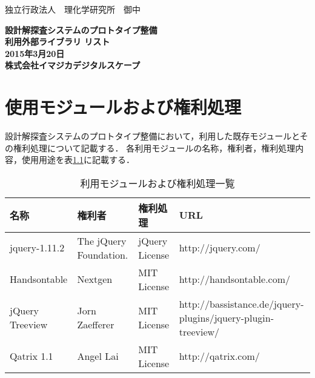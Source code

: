\documentclass[a4paper,10pt,oneside]{jsbook}
\begin{document}
\begin{titlepage}
\noindent
独立行政法人　理化学研究所　御中
\begin{center}
	\vspace{8cm}
	{\Huge \textbf{設計解探査システムのプロトタイプ整備} } \\
	\vspace{1cm}
	{\Huge \textbf{利用外部ライブラリ リスト}} \\
	\vspace{10cm}
	{\Large \textbf{2015年3月20日}} \\
	\vspace{0.5cm}
	{\Large \textbf{株式会社イマジカデジタルスケープ}}
\end{center}
\end{titlepage}

\tableofcontents

\chapter{使用モジュールおよび権利処理}
設計解探査システムのプロトタイプ整備において，利用した既存モジュールとその権利処理について記載する．
各利用モジュールの名称，権利者，権利処理内容，使用用途を表\ref{ops}に記載する．

\begin{table}[htbp]
\begin{center}
\caption{利用モジュールおよび権利処理一覧}
\label{ops}
\begin{tabular}{|l|l|l|l|}
\hline
名称 & 権利者 & 権利処理  & URL \\
\hline
\hline
jquery-1.11.2 & The jQuery Foundation. &  jQuery License & http://jquery.com/  \\
\hline
Handsontable & Nextgen & MIT License &  http://handsontable.com/ \\
\hline
jQuery Treeview & Jorn Zaefferer & MIT License & http://bassistance.de/jquery-plugins/jquery-plugin-treeview/\\
\hline
Qatrix 1.1 & Angel Lai &  MIT License & http://qatrix.com/\\
\hline
\end{tabular}
\end{center}
\end{table}
\end{document}
